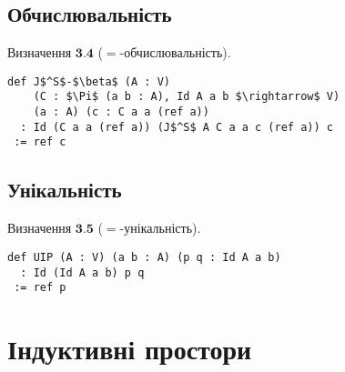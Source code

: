 \documentclass{article}
\theoremstyle{definition}
\begin{document}
\subsection{Обчислювальність}
$\textbf{Визначення\ 3.4}$ ($=$-обчислювальність).
\begin{lstlisting}[mathescape=true]
def J$^S$-$\beta$ (A : V)
    (C : $\Pi$ (a b : A), Id A a b $\rightarrow$ V)
    (a : A) (c : C a a (ref a))
  : Id (C a a (ref a)) (J$^S$ A C a a c (ref a)) c
 := ref c
\end{lstlisting}

\subsection{Унікальність}
$\textbf{Визначення\ 3.5}$ ($=$-унікальність).
\begin{lstlisting}[mathescape=true]
def UIP (A : V) (a b : A) (p q : Id A a b)
  : Id (Id A a b) p q
 := ref p
\end{lstlisting}

\newpage
\section{Індуктивні простори}
\end{document}

